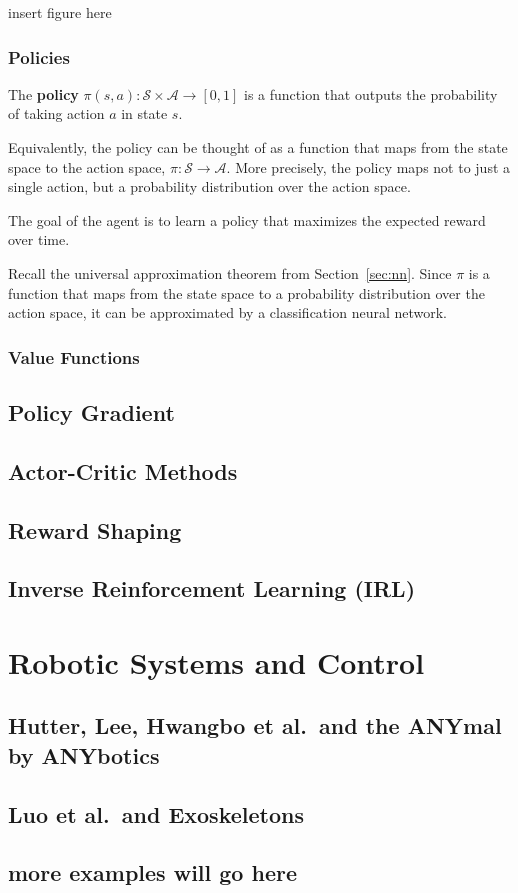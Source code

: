 \documentclass[12pt]{report}
\theoremstyle{definition}
\theoremstyle{remark}
\begin{document}
insert figure here

\subsection{Policies}

The \textbf{policy} $\pi(s, a): \mathcal{S} \times \mathcal{A} \to [0,1]$ is a function that outputs the probability of taking action $a$ in state $s$.

Equivalently, the policy can be thought of as a function that maps from the state space to the action space, $\pi: \mathcal{S} \to \mathcal{A}$. More precisely, the policy maps not to just a single action, but a probability distribution over the action space.

The goal of the agent is to learn a policy that maximizes the expected reward over time.

Recall the universal approximation theorem from Section~\ref{sec:nn}. Since $\pi$ is a function that maps from the state space to a probability distribution over the action space, it can be approximated by a classification neural network.

\subsection{Value Functions}



\section{Policy Gradient}

\section{Actor-Critic Methods}

\section{Reward Shaping}

\section{Inverse Reinforcement Learning (IRL)}

\chapter{Robotic Systems and Control}

\section{Hutter, Lee, Hwangbo et al.\ and the ANYmal by ANYbotics}

\cite{hutter_legged_2022}

\section{Luo et al.\ and Exoskeletons}

\section{more examples will go here}

\printglossaries

\printbibliography
{}
\end{document}
